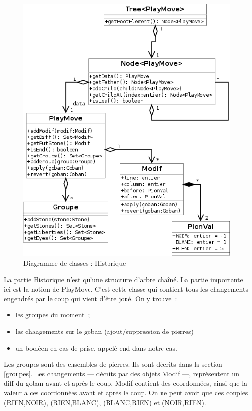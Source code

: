 \documentclass[11pt,a4paper,titlepage,french]{article}
\begin{document}
					\begin{figure}[hbt]
						\begin{center}
							\includegraphics[width=\textwidth]{./history.png}
						\end{center}
						\caption{Diagramme de classes : Historique}
						\label{history}
					\end{figure}

				La partie Historique n'est qu'une structure d'arbre chaîné. La partie importante ici est la notion de PlayMove. C'est cette classe qui contient tous les changements engendrés par le coup qui vient d'être joué. On y trouve~:
				\begin{itemize}
					\item les groupes du moment~;
					\item les changements sur le goban (ajout/suppression de pierres)~;
					\item un booléen en cas de prise, appelé end dans notre cas.
				\end{itemize}

				Les groupes sont des ensembles de pierres. Ils sont décrits dans la section \ref{groupes}. Les changements --- décrits par des objets Modif ---, représentent un diff du goban avant et après le coup. Modif contient des coordonnées, ainsi que la valeur à ces coordonnées avant et après le coup. On ne peut avoir que des couples (RIEN,NOIR), (RIEN,BLANC), (BLANC,RIEN) et (NOIR,RIEN).
\end{document}
